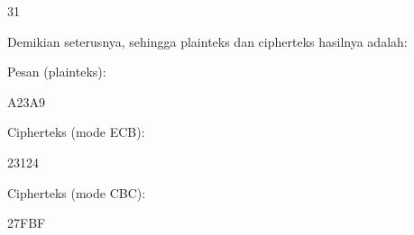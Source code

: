 \documentclass{article}
\begin{document}

31

Demikian seterusnya, sehingga plainteks dan cipherteks hasilnya adalah: 

Pesan (plainteks): 


A23A9 

Cipherteks (mode ECB):  

23124 

Cipherteks (mode CBC):  

27FBF
\end{document}
